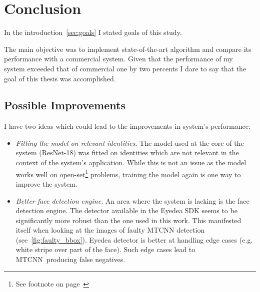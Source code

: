 \chapter{Conclusion}\label{ch:conclusion}
In the introduction~\ref{sec:goals} I stated goals of this study.

The main objective was to implement state-of-the-art algorithm and compare its performance with a commercial system.
Given that the performance of my system exceeded that of commercial one by two percents I dare to say that the
goal of this thesis was accomplished.

\section{Possible Improvements}\label{sec:possible-improvements}
I have two ideas which could lead to the improvements in system's performance:
\begin{itemize}
    \item \textit{Fitting the model on relevant identities.} The model used at the core of the system (ResNet-18) was
    fitted on identities which are not relevant in the context of the system's application.
    While this is not an issue as the model works well on open-set\footnote{See footnote on page~\pageref{foot:openset}}
    problems, training the model again is one way to improve the system.
    \item \textit{Better face detection engine.} An area where the system is lacking is the face detection engine.
    The detector available in the Eyedea SDK seems to be significantly more robust than the one used in this work.
    This manifested itself when looking at the images of faulty MTCNN detection (see~\ref{fig:faulty_bbox}).
    Eyedea detector is better at handling edge cases (e.g. white stripe over part of the face).
    Such edge cases lead to MTCNN producing false negatives.
\end{itemize}